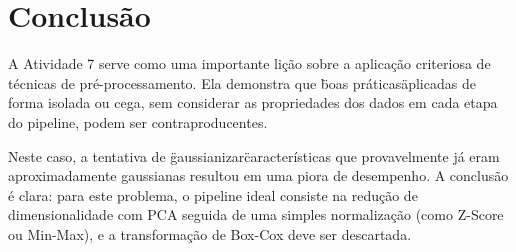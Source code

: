 \documentclass[a4paper,12pt]{article}
\begin{document}
\section{Conclusão}

A Atividade 7 serve como uma importante lição sobre a aplicação criteriosa de técnicas de pré-processamento. Ela demonstra que \"boas práticas\" aplicadas de forma isolada ou cega, sem considerar as propriedades dos dados em cada etapa do pipeline, podem ser contraproducentes. 

Neste caso, a tentativa de \"gaussianizar\" características que provavelmente já eram aproximadamente gaussianas resultou em uma piora de desempenho. A conclusão é clara: para este problema, o pipeline ideal consiste na redução de dimensionalidade com PCA seguida de uma simples normalização (como Z-Score ou Min-Max), e a transformação de Box-Cox deve ser descartada.
\end{document}
